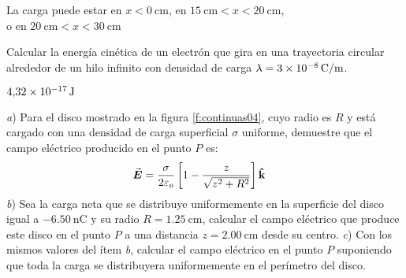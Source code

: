 \begin{Answer}
  \begin{minipage}[t]{.4\textwidth}
  La carga puede estar en $ x < \SI{0}{\centi\metre}$, en $\SI{15}{\centi\metre} < x < \SI{20}{\centi\metre}$,\\ o en $\SI{20}{\centi\metre} < x < \SI{30}{\centi\metre}$
  \end{minipage}
\end{Answer}
%
\begin{center}
\end{center}
%
\begin{Exercise}
  Calcular la energía cinética de un electrón que gira en una trayectoria circular alrededor de un hilo infinito con densidad de carga $\lambda = \SI{3E-8}{\coulomb/\metre}$.
\end{Exercise}
\begin{Answer}
  $\SI{4.32E-17}{\joule}$
\end{Answer}
%
\begin{Exercise}\label{p:continuas04}
  \textit{a}) Para el disco mostrado en la figura \ref{f:continuas04}, cuyo radio es $R$ y está cargado con una densidad de carga superficial $\sigma$ uniforme, demuestre que el campo eléctrico producido en el punto $P$ es:
  \begin{align*}
    \va*{E} &= \frac{\sigma}{2\varepsilon_o} \left [ 1 - \frac{z}{\sqrt{z^2+R^2}} \right ] \vu{k}
  \end{align*}
  \textit{b}) Sea la carga neta que se distribuye uniformemente en la superficie del disco igual a $\SI{-6.50}{\nano\coulomb}$ y su radio $R = \SI{1.25}{\centi\metre}$, calcular el campo eléctrico que produce este disco en el punto $P$ a una distancia $z = \SI{2.00}{\centi\metre}$ desde su centro. \textit{c}) Con los mismos valores del ítem \textit{b}, calcular el campo eléctrico en el punto $P$ suponiendo que toda la carga se distribuyera uniformemente en el perímetro del disco.
\end{Exercise}
